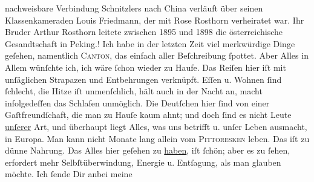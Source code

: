 \begin{ledgroupsized}[t]{13cm}
{{{                  nachweisbare Verbindung Schnitzlers nach China verläuft über seinen Klassenkameraden
                     Louis Friedmann, der mit Rose Rosthorn verheiratet war. Ihr Bruder
                     Arthur Rosthorn leitete zwischen
                     1895 und 1898 die österreichische Gesandtschaft in
                     Peking.}}}\label{K_L02845-1h}!\pend
           \pstart
           Ich habe in der letzten {\pb}Zeit viel merkwürdige Dinge
               geſehen, namentlich \textsc{Canton}, das einfach aller Beſchreibung ſpottet.\pend
           \pstart
           Aber Alles in Allem wünſchte ich, ich wäre ſchon wieder zu Haufe. Das Reiſen hier iſt
               mit unſäglichen Strapazen und Entbehrungen verknüpft. Eſſen u. Wohnen ſind ſchlecht,
               die Hitze iſt \strikeout{\textcolor{gray}{e}\textcolor{gray}{×}} unmenſchlich, hält auch in der Nacht an,
               macht infolgedeſſen das Schlafen unmöglich. Die Deutſchen hier ſind von einer {\pb}Gaſtfreundſchaft, die man zu Hauſe kaum ahnt; und doch ſind es nicht Leute \uline{unſerer} Art, und überhaupt liegt Alles, was uns
               betrifft u. unſer Leben ausmacht, in Europa.  Man kann nicht Monate lang allein vom \textsc{Pittoresken} leben. Das iſt zu dünne Nahrung. Das Alles hier
               geſehen zu \uline{haben}, iſt ſchön;  aber es zu ſehen, erfordert
               mehr Selbſtüberwindung, Energie u. Entſagung, als man
               glauben möchte.\pend
           \pstart
           Ich ſende Dir anbei meine \label{K_L02845-2v}
\end{ledgroupsized}
